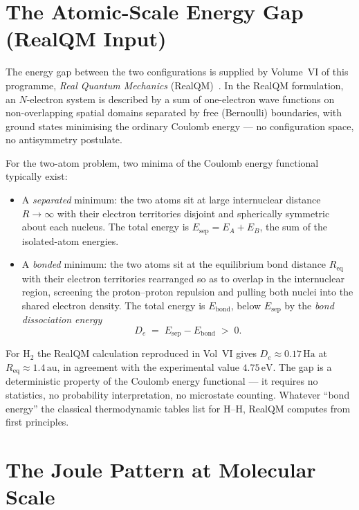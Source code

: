 \section{The Atomic-Scale Energy Gap (RealQM Input)}

The energy gap between the two configurations is supplied by Volume~VI of
this programme, \emph{Real Quantum Mechanics} (RealQM)~\cite{RealQM2026}.
In the RealQM formulation, an $N$-electron system is described by a sum of
one-electron wave functions on non-overlapping spatial domains separated by
free (Bernoulli) boundaries, with ground states minimising the ordinary
Coulomb energy --- no configuration space, no antisymmetry postulate.

For the two-atom problem, two minima of the Coulomb energy functional
typically exist:

\begin{itemize}
\item A \emph{separated} minimum: the two atoms sit at large internuclear
distance $R \to \infty$ with their electron territories disjoint and
spherically symmetric about each nucleus. The total energy is
$E_{\mathrm{sep}} = E_A + E_B$, the sum of the isolated-atom energies.

\item A \emph{bonded} minimum: the two atoms sit at the equilibrium bond
distance $R_{\mathrm{eq}}$ with their electron territories rearranged so as
to overlap in the internuclear region, screening the proton--proton
repulsion and pulling both nuclei into the shared electron density. The
total energy is $E_{\mathrm{bond}}$, below $E_{\mathrm{sep}}$ by the
\emph{bond dissociation energy}
\begin{equation}
  D_e \;=\; E_{\mathrm{sep}} - E_{\mathrm{bond}} \;>\; 0.
  \label{eq:De}
\end{equation}
\end{itemize}

For $\mathrm{H}_2$ the RealQM calculation reproduced in Vol~VI gives $D_e
\approx 0.17\,\mathrm{Ha}$ at $R_{\mathrm{eq}} \approx 1.4\,\mathrm{au}$, in
agreement with the experimental value $4.75\,\mathrm{eV}$. The gap is a
deterministic property of the Coulomb energy functional --- it requires no
statistics, no probability interpretation, no microstate counting. Whatever
``bond energy'' the classical thermodynamic tables list for H--H, RealQM
computes from first principles.

\section{The Joule Pattern at Molecular Scale}

